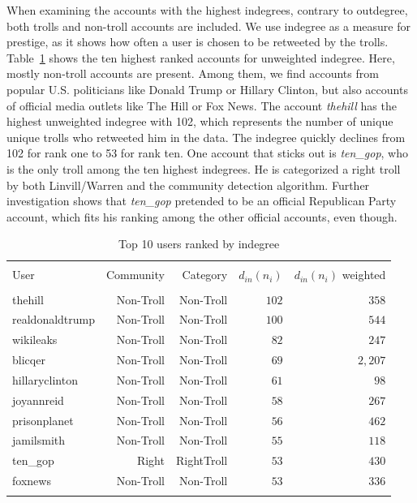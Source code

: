 \documentclass[12pt, titlepage=true, toc=bib]{scrartcl}
\begin{document}
When examining the accounts with the highest indegrees, contrary to outdegree, both trolls and non-troll accounts are included. We use indegree as a measure for prestige, as it shows how often a user is chosen to be retweeted by the trolls. Table~\ref{tab:in} shows the ten highest ranked accounts for unweighted indegree. Here, mostly non-troll accounts are present. Among them, we find  accounts from popular U.S. politicians like Donald Trump or Hillary Clinton, but also accounts of official media outlets like The Hill or Fox News. The account \textit{thehill} has the highest unweighted indegree with 102, which represents the number of unique unique trolls who retweeted him in the data. The indegree quickly declines from 102 for rank one to 53 for rank ten. One account that sticks out is \textit{ten\_gop}, who is the only troll among the ten highest indegrees. He is categorized a right troll by both Linvill/Warren \cite*{linvill_troll_2018} and the community detection algorithm. Further investigation shows that \textit{ten\_gop} pretended to be an official Republican Party account, which fits his ranking among the other official accounts, even though. %

\begin{table}[ht] \centering 
  \begin{tabular*}{.95\linewidth}{@{\extracolsep{\fill}} lrrrr} 
\\[-1.8ex]\hline 
\hline \\[-1.8ex] 
User & Community & Category & \( d_{in}(n_{i}) \) & \( d_{in}(n_{i}) \) weighted \\ 
\hline \\[-1.8ex] 
thehill & Non-Troll & Non-Troll & $102$ & $358$ \\ 
realdonaldtrump & Non-Troll & Non-Troll & $100$ & $544$ \\ 
wikileaks & Non-Troll & Non-Troll & $82$ & $247$ \\ 
blicqer & Non-Troll & Non-Troll & $69$ & $2,207$ \\ 
hillaryclinton & Non-Troll & Non-Troll & $61$ & $98$ \\ 
joyannreid & Non-Troll & Non-Troll & $58$ & $267$ \\ 
prisonplanet & Non-Troll & Non-Troll & $56$ & $462$ \\ 
jamilsmith & Non-Troll & Non-Troll & $55$ & $118$ \\ 
ten\_gop & Right & RightTroll & $53$ & $430$ \\ 
foxnews & Non-Troll & Non-Troll & $53$ & $336$ \\ 
\hline \\[-1.8ex] 
\end{tabular*} 
\caption{Top 10 users ranked by indegree} 
  \label{tab:in} 
\end{table} 
\end{document}
